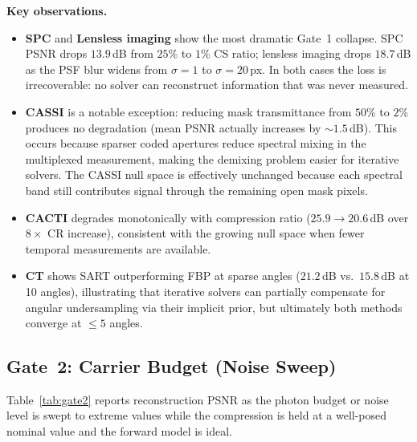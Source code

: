 \documentclass[11pt]{article}
\theoremstyle{definition}
\begin{document}
\noindent\textbf{Key observations.}
\begin{itemize}
  \item \textbf{SPC} and \textbf{Lensless imaging} show the most dramatic Gate~1 collapse.
    SPC PSNR drops $13.9$\,dB from $25$\% to $1$\% CS ratio; lensless imaging drops
    $18.7$\,dB as the PSF blur widens from $\sigma{=}1$ to $\sigma{=}20$\,px.
    In both cases the loss is irrecoverable: no solver can reconstruct
    information that was never measured.
  \item \textbf{CASSI} is a notable exception: reducing mask transmittance from
    $50$\% to $2$\% produces no degradation (mean PSNR actually increases by
    ${\sim}1.5$\,dB). This occurs because sparser coded apertures reduce
    spectral mixing in the multiplexed measurement, making the
    demixing problem easier for iterative solvers.  The CASSI null space
    is effectively unchanged because each spectral band still contributes
    signal through the remaining open mask pixels.
  \item \textbf{CACTI} degrades monotonically with compression ratio
    ($25.9 \to 20.6$\,dB over $8\times$ CR increase), consistent with the
    growing null space when fewer temporal measurements are available.
  \item \textbf{CT} shows SART outperforming FBP at sparse angles
    ($21.2$\,dB vs.\ $15.8$\,dB at 10 angles), illustrating that iterative
    solvers can partially compensate for angular undersampling via their
    implicit prior, but ultimately both methods converge at $\leq 5$ angles.
\end{itemize}


\subsection{Gate~2: Carrier Budget (Noise Sweep)}

Table~\ref{tab:gate2} reports reconstruction PSNR as the photon budget
or noise level is swept to extreme values while the compression is held
at a well-posed nominal value and the forward model is ideal.
\end{document}
